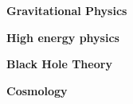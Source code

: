 
\begin{cventries}
  \vspace{-0.5cm}
  \cventry
    {} %
    {} %
    {} %
    {} %
    {
      \begin{cvitems} %
         \item{\textbf{Gravitational Physics}}
         \item{\textbf{High energy physics}}
         \item{\textbf{Black Hole Theory}}
         \item{\textbf{Cosmology}}
      \end{cvitems}
    }
  \vspace{-0.4cm}
\end{cventries}
